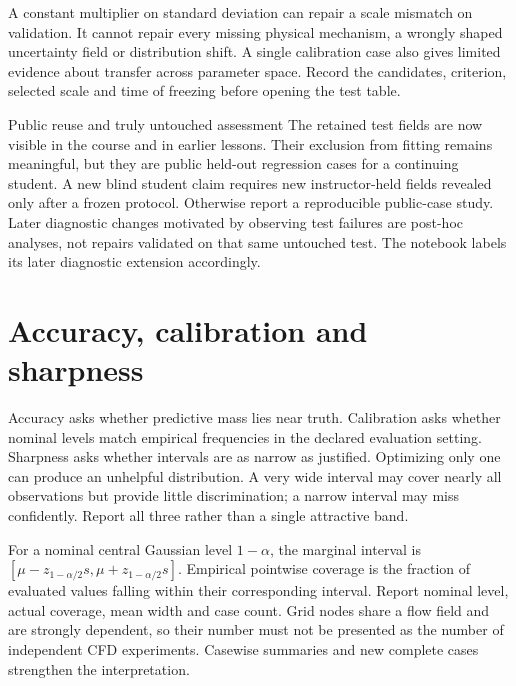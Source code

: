 \documentclass[11pt]{article}
\begin{document}
A constant multiplier on standard deviation can repair a scale mismatch on
validation. It cannot repair every missing physical mechanism, a wrongly shaped
uncertainty field or distribution shift. A single calibration case also gives
limited evidence about transfer across parameter space. Record the candidates,
criterion, selected scale and time of freezing before opening the test table.

\begin{worked}{Public reuse and truly untouched assessment}
The retained test fields are now visible in the course and in earlier lessons.
Their exclusion from fitting remains meaningful, but they are public held-out
regression cases for a continuing student. A new blind student claim requires
new instructor-held fields revealed only after a frozen protocol. Otherwise
report a reproducible public-case study. Later diagnostic changes motivated by
observing test failures are post-hoc analyses, not repairs validated on that same
untouched test. The notebook labels its later diagnostic extension accordingly.
\end{worked}

\section{Accuracy, calibration and sharpness}
Accuracy asks whether predictive mass lies near truth. Calibration asks whether
nominal levels match empirical frequencies in the declared evaluation setting.
Sharpness asks whether intervals are as narrow as justified. Optimizing only one
can produce an unhelpful distribution. A very wide interval may cover nearly
all observations but provide little discrimination; a narrow interval may miss
confidently. Report all three rather than a single attractive band.

For a nominal central Gaussian level $1-\alpha$, the marginal interval is
$[\mu-z_{1-\alpha/2}s,\mu+z_{1-\alpha/2}s]$. Empirical pointwise coverage is
the fraction of evaluated values falling within their corresponding interval.
Report nominal level, actual coverage, mean width and case count. Grid nodes
share a flow field and are strongly dependent, so their number must not be
presented as the number of independent CFD experiments. Casewise summaries
and new complete cases strengthen the interpretation.
\end{document}
